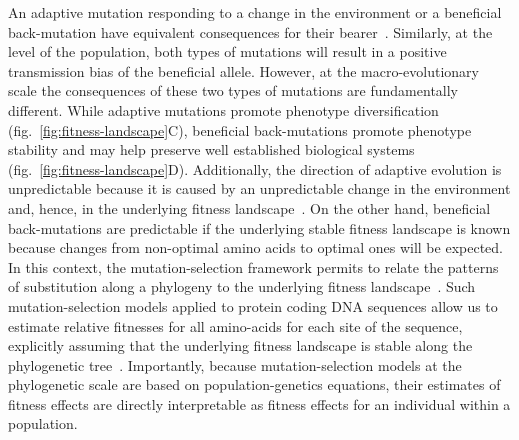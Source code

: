 \documentclass{article}
\begin{document}
    An adaptive mutation responding to a change in the environment or a beneficial back-mutation have equivalent consequences for their bearer~\cite{charlesworth_other_2007}.
    Similarly, at the level of the population, both types of mutations will result in a positive transmission bias of the beneficial allele.
    However, at the macro-evolutionary scale the consequences of these two types of mutations are fundamentally different.
    While adaptive mutations promote phenotype diversification (fig.~\ref{fig:fitness-landscape}C), beneficial back-mutations promote phenotype stability and may help preserve well established biological systems (fig.~\ref{fig:fitness-landscape}D).
    Additionally, the direction of adaptive evolution is unpredictable because it is caused by an unpredictable change in the environment and, hence, in the underlying fitness landscape~\cite{bazykin_changing_2015}.
    On the other hand, beneficial back-mutations are predictable if the underlying stable fitness landscape is known because changes from non-optimal amino acids to optimal ones will be expected.
    In this context, the mutation-selection framework permits to relate the patterns of substitution along a phylogeny to the underlying fitness landscape~\cite{halpern_evolutionary_1998, mccandlish_modeling_2014}.
    Such mutation-selection models applied to protein coding DNA sequences allow us to estimate relative fitnesses for all amino-acids for each site of the sequence, explicitly assuming that the underlying fitness landscape is stable along the phylogenetic tree~\cite{rodrigue_mechanistic_2010, tamuri_estimating_2012, rodrigue_detecting_2017}.
    Importantly, because mutation-selection models at the phylogenetic scale are based on population-genetics equations, their estimates of fitness effects are directly interpretable as fitness effects for an individual within a population.
\end{document}
